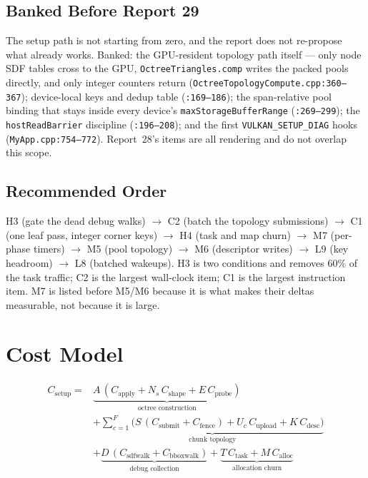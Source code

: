 \documentclass[11pt,a4paper]{article}
\begin{document}
\subsection{Banked Before Report 29}
\label{sec:banked29}

The setup path is not starting from zero, and the report does not re-propose
what already works. Banked: the GPU-resident topology path itself --- only
node SDF tables cross to the GPU, \texttt{OctreeTriangles.comp} writes the
packed pools directly, and only integer counters return
(\texttt{OctreeTopologyCompute.cpp:360--367}); device-local keys and dedup
table (\texttt{:169--186}); the span-relative pool binding that stays inside
every device's \texttt{maxStorageBufferRange} (\texttt{:269--299}); the
\texttt{hostReadBarrier} discipline (\texttt{:196--208}); and the first
\texttt{VULKAN\_SETUP\_DIAG} hooks (\texttt{MyApp.cpp:754--772}). Report~28's
items are all rendering and do not overlap this scope.

\subsection{Recommended Order}

H3 (gate the dead debug walks) $\rightarrow$ C2 (batch the topology
submissions) $\rightarrow$ C1 (one leaf pass, integer corner keys)
$\rightarrow$ H4 (task and map churn) $\rightarrow$ M7 (per-phase timers)
$\rightarrow$ M5 (pool topology) $\rightarrow$ M6 (descriptor writes)
$\rightarrow$ L9 (key headroom) $\rightarrow$ L8 (batched wakeups).
H3 is two conditions and removes 60\% of the task traffic; C2 is the largest
wall-clock item; C1 is the largest instruction item. M7 is listed before
M5/M6 because it is what makes their deltas measurable, not because it is
large.

\section{Cost Model}

\begin{equation}
\begin{aligned}
C_{\mathrm{setup}} = &\underbrace{A\,(C_{\mathrm{apply}} + N_s\,C_{\mathrm{shape}} + E\,C_{\mathrm{probe}})}_{\text{octree construction}} \\
&+ \underbrace{\sum_{c=1}^{F} \bigl( S\,(C_{\mathrm{submit}} + C_{\mathrm{fence}}) + U_c\,C_{\mathrm{upload}} + K\,C_{\mathrm{desc}} \bigr)}_{\text{chunk topology}} \\
&+ \underbrace{D\,(C_{\mathrm{sdfwalk}} + C_{\mathrm{bboxwalk}})}_{\text{debug collection}} + \underbrace{T\,C_{\mathrm{task}} + M\,C_{\mathrm{alloc}}}_{\text{allocation churn}}
\end{aligned}
\end{equation}
\end{document}
